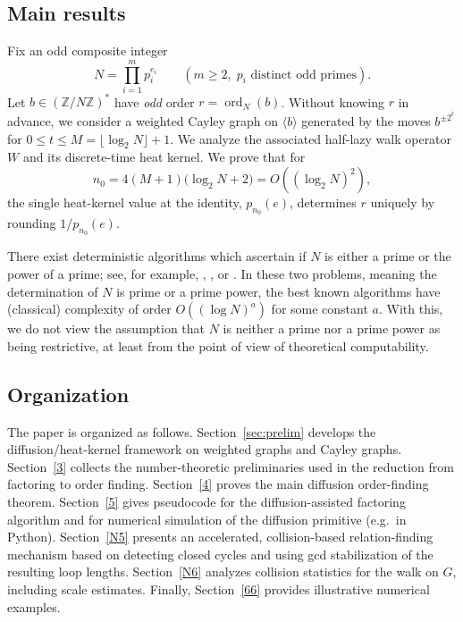 \documentclass[11pt,reqno]{article}
\numberwithin{equation}{section}
\DeclareMathOperator{\ord}{ord}
\theoremstyle{plain}
\theoremstyle{definition}
\theoremstyle{remark}
\newcommand{\Z}{\mathbb{Z}}
\begin{document}

\subsection{Main results}

Fix an odd composite integer
\begin{equation}\label{eq:intro:N}
N=\prod_{i=1}^m p_i^{e_i}
\qquad (m\ge 2,\; p_i \text{ distinct odd primes}).
\end{equation}
Let $b\in(\Z/N\Z)^\ast$ have \emph{odd} order $r=\ord_N(b)$.
Without knowing $r$ in advance, we consider a weighted Cayley graph on $\langle b\rangle$ generated by the moves
$b^{\pm 2^t}$ for $0\le t\le M=\lfloor\log_2 N\rfloor+1$.
We analyze the associated half-lazy walk operator $W$ and its discrete-time heat kernel.
We prove that for
\[
n_0 = 4(M+1)\bigl(\log_2 N + 2\bigr)=O((\log_2 N)^2),
\]
the single heat-kernel value at the identity, $p_{n_0}(e)$, determines $r$ uniquely by rounding $1/p_{n_0}(e)$.

There exist deterministic algorithms which ascertain if $N$ is either a prime or the
power of a prime; see, for example, \cite{AKS04}, \cite{Be07}, or \cite{Ra80}.
In these two problems, meaning the determination of $N$ is prime or a prime power, the best known
algorithms have (classical) complexity of order $O((\log N)^{a})$ for some constant $a$.
With this, we do not view the assumption that $N$ is neither a prime nor a prime power as being restrictive, at least from the point of view of theoretical computability.


\subsection{Organization}

The paper is organized as follows.
Section~\ref{sec:prelim} develops the diffusion/heat-kernel framework on weighted graphs and Cayley graphs.
Section~\ref{3} collects the number-theoretic preliminaries used in the reduction from factoring to order finding.
Section~\ref{4} proves the main diffusion order-finding theorem. Section~\ref{5} gives pseudocode for the diffusion-assisted factoring algorithm and for numerical simulation of the diffusion primitive (e.g.\ in Python).
Section~\ref{N5} presents an accelerated, collision-based relation-finding mechanism based on detecting closed cycles and using gcd stabilization of the resulting loop lengths.
Section~\ref{N6} analyzes collision statistics for the walk on $G$, including scale estimates.
Finally, Section~\ref{66} provides illustrative numerical examples.
\end{document}

